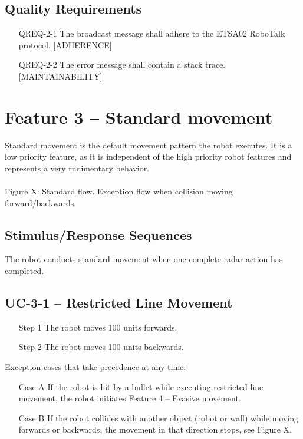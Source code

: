 \documentclass{scrreprt}
\begin{document}
\subsection{Quality Requirements}
\begin{itemize}
\item[QREQ-2-1] The broadcast message shall adhere to the ETSA02 RoboTalk protocol. [ADHERENCE]
\item[QREQ-2-2] The error message shall contain a stack trace. [MAINTAINABILITY]
\end{itemize}

\section{Feature 3 -- Standard movement }
Standard movement is the default movement pattern the robot executes. It is a low priority feature, as it is independent of the high priority robot features and represents a very rudimentary behavior.\\\\
	
Figure X: Standard flow. Exception flow when collision moving forward/backwards.
	
\subsection{Stimulus/Response Sequences}
The robot conducts standard movement when one complete radar action has completed.
	
\subsection{UC-3-1 -- Restricted Line Movement}	
\begin{itemize}
\item[Step 1] The robot moves 100 units forwards.
\item[Step 2] The robot moves 100 units backwards.
\end{itemize}

Exception cases that take precedence at any time:
\begin{itemize}
\item[Case A] If the robot is hit by a bullet while executing restricted line movement, the robot initiates Feature 4 – Evasive movement.
\item[Case B] If the robot collides with another object (robot or wall) while moving forwards or backwards, the movement in that direction stops, see Figure X.
\end{itemize}
\end{document}
